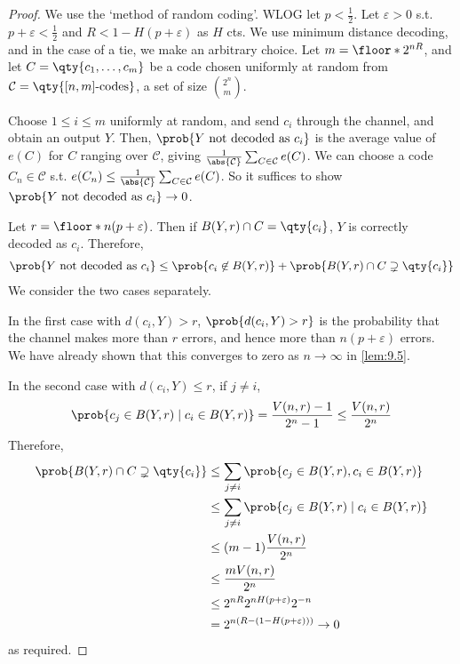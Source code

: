 \begin{proof}
    We use the `method of random coding'.
    WLOG let $p < \frac{1}{2}$.
    Let $\varepsilon > 0$ s.t. $p + \varepsilon < \frac{1}{2}$ and $R < 1 - H(p + \varepsilon)$ as $H$ cts.
    We use minimum distance decoding, and in the case of a tie, we make an arbitrary choice.
    Let $m = \floor*{2^{nR}}$, and let $C = \qty{c_1, \dots, c_m}$ be a code chosen uniformly at random from $\mathcal C = \qty{[n,m]\text{-codes}}$, a set of size $\binom{2^n}{m}$.

    Choose $1 \leq i \leq m$ uniformly at random, and send $c_i$ through the channel, and obtain an output $Y$.
    Then, $\prob{Y \text{ not decoded as } c_i}$ is the average value of $e(C)$ for $C$ ranging over $\mathcal C$, giving $\frac{1}{\abs{\mathcal C}} \sum_{C \in \mathcal C} e(C)$.
    We can choose a code $C_n \in \mathcal C$ s.t. $e(C_n) \leq \frac{1}{\abs{\mathcal C}}\sum_{C \in \mathcal C} e(C)$.
    So it suffices to show $\prob{Y \text{ not decoded as } c_i} \to 0$.

    Let $r = \floor*{n(p + \varepsilon)}$.
    Then if $B(Y,r) \cap C = \qty{c_i}$, $Y$ is correctly decoded as $c_i$.
    Therefore,
    \begin{align*}
        \prob{Y \text{ not decoded as } c_i} \leq \prob{c_i \not\in B(Y,r)} + \prob{B(Y,r) \cap C \supsetneq \qty{c_i}}
    \end{align*}
    We consider the two cases separately.

    In the first case with $d(c_i,Y) > r$, $\prob{d(c_i,Y) > r}$ is the probability that the channel makes more than $r$ errors, and hence more than $n(p + \varepsilon)$ errors.
    We have already shown that this converges to zero as $n \to \infty$ in \cref{lem:9.5}.

    In the second case with $d(c_i,Y) \leq r$, if $j \neq i$,
    \begin{align*}
        \prob{c_j \in B(Y,r) \mid c_i \in B(Y,r)} = \frac{V(n,r) - 1}{2^n - 1} \leq \frac{V(n,r)}{2^n}
    \end{align*}
    Therefore,
    \begin{align*}
        \prob{B(Y,r) \cap C \supsetneq \qty{c_i}} &\leq \sum_{j \neq i} \prob{c_j \in B(Y,r), c_i \in B(Y,r)} \\
        &\leq \sum_{j \neq i} \prob{c_j \in B(Y,r) \mid c_i \in B(Y,r)} \\
        &\leq (m-1) \frac{V(n,r)}{2^n} \\
        &\leq \frac{mV(n,r)}{2^n} \\
        &\leq 2^{nR} 2^{nH(p+\varepsilon)} 2^{-n} \\
        &= 2^{n(R - (1 - H(p+\varepsilon)))} \to 0
    \end{align*}
    as required.
\end{proof}

